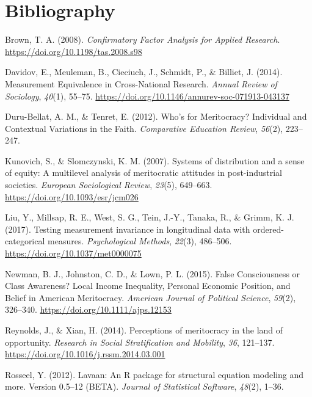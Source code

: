 \documentclass[
]{article}
\begin{document}
\hypertarget{bibliography}{%
\section*{Bibliography}\label{bibliography}}

\hypertarget{refs}{}
\leavevmode\hypertarget{ref-Brown2008}{}%
Brown, T. A. (2008). \emph{Confirmatory Factor Analysis for Applied
Research}. \url{https://doi.org/10.1198/tas.2008.s98}

\leavevmode\hypertarget{ref-Davidovetal2014}{}%
Davidov, E., Meuleman, B., Cieciuch, J., Schmidt, P., \& Billiet, J.
(2014). Measurement Equivalence in Cross-National Research. \emph{Annual
Review of Sociology}, \emph{40}(1), 55--75.
\url{https://doi.org/10.1146/annurev-soc-071913-043137}

\leavevmode\hypertarget{ref-Duru-bellat2012}{}%
Duru-Bellat, A. M., \& Tenret, E. (2012). Who's for Meritocracy?
Individual and Contextual Variations in the Faith. \emph{Comparative
Education Review}, \emph{56}(2), 223--247.

\leavevmode\hypertarget{ref-Kunovich2007}{}%
Kunovich, S., \& Slomczynski, K. M. (2007). Systems of distribution and
a sense of equity: A multilevel analysis of meritocratic attitudes in
post-industrial societies. \emph{European Sociological Review},
\emph{23}(5), 649--663. \url{https://doi.org/10.1093/esr/jcm026}

\leavevmode\hypertarget{ref-liuTestingMeasurementInvariance2017}{}%
Liu, Y., Millsap, R. E., West, S. G., Tein, J.-Y., Tanaka, R., \& Grimm,
K. J. (2017). Testing measurement invariance in longitudinal data with
ordered-categorical measures. \emph{Psychological Methods},
\emph{22}(3), 486--506. \url{https://doi.org/10.1037/met0000075}

\leavevmode\hypertarget{ref-Newman2015}{}%
Newman, B. J., Johnston, C. D., \& Lown, P. L. (2015). False
Consciousness or Class Awareness? Local Income Inequality, Personal
Economic Position, and Belief in American Meritocracy. \emph{American
Journal of Political Science}, \emph{59}(2), 326--340.
\url{https://doi.org/10.1111/ajps.12153}

\leavevmode\hypertarget{ref-Reynolds2014}{}%
Reynolds, J., \& Xian, H. (2014). Perceptions of meritocracy in the land
of opportunity. \emph{Research in Social Stratification and Mobility},
\emph{36}, 121--137. \url{https://doi.org/10.1016/j.rssm.2014.03.001}

\leavevmode\hypertarget{ref-Rosseel2012}{}%
Rosseel, Y. (2012). Lavaan: An R package for structural equation
modeling and more. Version 0.5--12 (BETA). \emph{Journal of Statistical
Software}, \emph{48}(2), 1--36.
\end{document}
